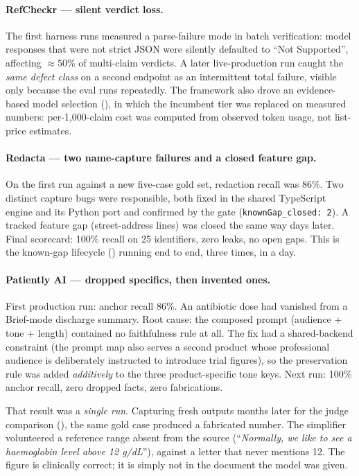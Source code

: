 \documentclass[11pt,a4paper]{article}
\begin{document}
\paragraph{RefCheckr --- silent verdict loss.}
The first harness runs measured a parse-failure mode in batch verification: model responses that were
not strict JSON were silently defaulted to ``Not Supported'', affecting ${\approx}50\%$ of
multi-claim verdicts. A later live-production run caught the \emph{same defect class} on a second
endpoint as an intermittent total failure, visible only because the eval runs repeatedly. The
framework also drove an evidence-based model selection (), in which the incumbent
tier was replaced on measured numbers: per-1{,}000-claim cost was computed from observed token usage,
not list-price estimates.

\paragraph{Redacta --- two name-capture failures and a closed feature gap.}
On the first run against a new five-case gold set, redaction recall was 86\%. Two distinct capture
bugs were responsible, both fixed in the shared TypeScript engine and its Python port and confirmed
by the gate (\texttt{knownGap\_closed: 2}). A tracked feature gap (street-address lines) was closed
the same way days later. Final scorecard: 100\% recall on 25 identifiers, zero leaks, no open gaps.
This is the known-gap lifecycle () running end to end, three times, in a day.

\paragraph{Patiently AI --- dropped specifics, then invented ones.}
First production run: anchor recall 86\%. An antibiotic dose had vanished from a Brief-mode discharge
summary. Root cause: the composed prompt (audience + tone + length) contained no faithfulness rule at
all. The fix had a shared-backend constraint (the prompt map also serves a second product whose
professional audience is deliberately instructed to introduce trial figures), so the preservation rule
was added \emph{additively} to the three product-specific tone keys. Next run: 100\% anchor recall,
zero dropped facts, zero fabrications.

That result was a \emph{single run}. Capturing fresh outputs months later for the judge comparison
(), the same gold case produced a fabricated number. The simplifier volunteered a
reference range absent from the source (``\emph{Normally, we like to see a haemoglobin level above
12 g/dL}''), against a letter that never mentions 12. The figure is clinically correct; it is simply
not in the document the model was given.
\end{document}
